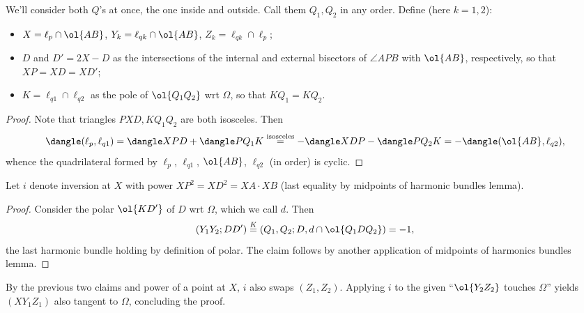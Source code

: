 \documentclass{seto}
\begin{document}
We'll consider both $Q$'s at once, the one inside and outside. Call them $Q_1,Q_2$ in any order. Define (here $k=1,2$): 
\begin{itemize} 
\item $X=\ell_p\cap\ol{AB}$, $Y_k=\ell_{qk}\cap\ol{AB}$, $Z_k=\ell_{qk}\cap\ell_p$; 
\item $D$ and $D'=2X-D$ as the intersections of the internal and external bisectors of $\angle APB$ with $\ol{AB}$, respectively, so that $XP=XD=XD'$;
\item $K=\ell_{q1}\cap\ell_{q2}$ as the pole of $\ol{Q_1Q_2}$ wrt $\Omega$, so that $KQ_1=KQ_2$. 
\end{itemize} 
\begin{proof} Note that triangles $PXD,KQ_1Q_2$ are both isosceles. Then 
\[\dangle(\ell_p,\ell_{q1})=\dangle XPD+\dangle PQ_1K \overset{\text{isosceles}}=-\dangle XDP-\dangle PQ_2K=-\dangle(\ol{AB},\ell_{q2}),\] 
whence the quadrilateral formed by $\ell_p$, $\ell_{q1}$, $\ol{AB}$, $\ell_{q2}$ (in order) is cyclic. 
\end{proof} 
Let $i$ denote inversion at $X$ with power $XP^2=XD^2=XA\cdot XB$ (last equality by midpoints of harmonic bundles lemma). 
\begin{proof}Consider the polar $\ol{KD'}$ of $D$ wrt $\Omega$, which we call $d$. Then \[(Y_1Y_2; DD') \overset K=(Q_1,Q_2; D,d\cap\ol{Q_1DQ_2})=-1,\] 
the last harmonic bundle holding by definition of polar. The claim follows by another application of midpoints of harmonics bundles lemma. 
\end{proof} 
By the previous two claims and power of a point at $X$, $i$ also swaps $(Z_1,Z_2)$. 
Applying $i$ to the given ``$\ol{Y_2Z_2}$ touches $\Omega$'' yields $(XY_1Z_1)$ also tangent to $\Omega$, concluding the proof. 
\end{document}
